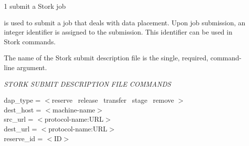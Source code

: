 \begin{ManPage}{\label{man-stork-submit}}{1}
{submit a Stork job}
\Synopsis {}
\ToolArgsBase




\Description 

 is used to submit a job that deals with data placement. 
Upon job submission, an integer identifier is assigned to the
submission.
This identifier can be used in Stork commands.

The name of the Stork submit description file is the single,
required, command-line argument.

\emph{STORK SUBMIT DESCRIPTION FILE COMMANDS}
\begin{description}

\item[dap\_type = $<$reserve \Bar\ release \Bar\ transfer \Bar\ stage \Bar\ remove $>$]

\item[dest\_host = $<$machine-name$>$]

\item[src\_url = $<$protocol-name:URL$>$]

\item[dest\_url = $<$protocol-name:URL$>$]

\item[reserve\_id = $<$ID$>$]


\end{description}
\end{ManPage}
